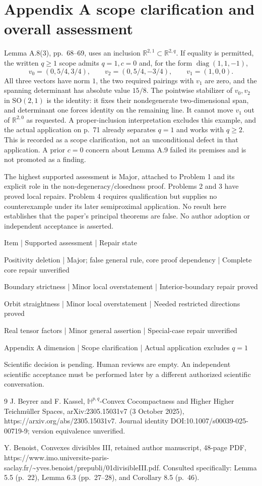 \documentclass[10pt]{article}
\begin{document}
\section*{Appendix A scope clarification and overall assessment}
Lemma A.8(3), pp. 68–69, uses an inclusion \(\mathbb R^{2,1}\subset\mathbb R^{2,q}\). If equality is permitted, the written \(q\geq1\) scope admits \(q=1,c=0\) and, for the form \(\operatorname{diag}(1,1,-1)\), \[v_0=(0,5/4,3/4),\qquad v_2=(0,5/4,-3/4),\qquad v_1=(1,0,0).\] All three vectors have norm \(1\), the two required pairings with \(v_1\) are zero, and the spanning determinant has absolute value \(15/8\). The pointwise stabilizer of \(v_0,v_2\) in \(\mathrm{SO}(2,1)\) is the identity: it fixes their nondegenerate two-dimensional span, and determinant one forces identity on the remaining line. It cannot move \(v_1\) out of \(\mathbb R^{2,0}\) as requested. A proper-inclusion interpretation excludes this example, and the actual application on p. 71 already separates \(q=1\) and works with \(q\geq2\). This is recorded as a scope clarification, not an unconditional defect in that application. A prior \(c=0\) concern about Lemma A.9 failed its premises and is not promoted as a finding.\par
The highest supported assessment is Major, attached to Problem 1 and its explicit role in the non-degeneracy/closedness proof. Problems 2 and 3 have proved local repairs. Problem 4 requires qualification but supplies no counterexample under its later semiproximal application. No result here establishes that the paper’s principal theorems are false. No author adoption or independent acceptance is asserted.\par
Item | Supported assessment | Repair state\par
Positivity deletion | Major; false general rule, core proof dependency | Complete core repair unverified\par
Boundary strictness | Minor local overstatement | Interior-boundary repair proved\par
Orbit straightness | Minor local overstatement | Needed restricted directions proved\par
Real tensor factors | Minor general assertion | Special-case repair unverified\par
Appendix A dimension | Scope clarification | Actual application excludes \(q=1\)\par
Scientific decision is pending. Human reviews are empty. An independent scientific acceptance must be performed later by a different authorized scientific conversation.\par
9 J. Beyrer and F. Kassel, \(\mathbb H^{p,q}\)-Convex Cocompactness and Higher Higher Teichmüller Spaces, arXiv:2305.15031v7 (3 October 2025), https://arxiv.org/abs/2305.15031v7. Journal identity DOI:10.1007/s00039-025-00719-9; version equivalence unverified.\par
Y. Benoist, Convexes divisibles III, retained author manuscript, 48-page PDF, https://www.imo.universite-paris-saclay.fr/\textasciitilde{}yves.benoist/prepubli/01divisibleIII.pdf. Consulted specifically: Lemma 5.5 (p. 22), Lemma 6.3 (pp. 27–28), and Corollary 8.5 (p. 46).\par
\end{document}
